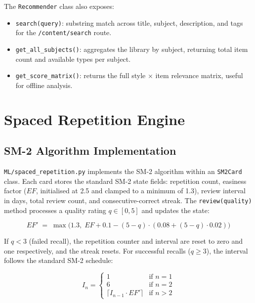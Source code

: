 \documentclass[12pt,a4paper]{article}
\begin{document}
The \texttt{Recommender} class also exposes:
\begin{itemize}[leftmargin=*]
  \item \texttt{search(query)}: substring match across title,
    subject, description, and tags for the \texttt{/content/search}
    route.
  \item \texttt{get\_all\_subjects()}: aggregates the library by
    subject, returning total item count and available types per
    subject.
  \item \texttt{get\_score\_matrix()}: returns the full
    style $\times$ item relevance matrix, useful for offline
    analysis.
\end{itemize}

\section{Spaced Repetition Engine}

\subsection{SM-2 Algorithm Implementation}

\texttt{ML/spaced\_repetition.py} implements the SM-2 algorithm
\cite{supermemo} within an \texttt{SM2Card} class. Each card stores
the standard SM-2 state fields: repetition count, easiness factor
($EF$, initialised at 2.5 and clamped to a minimum of 1.3), review
interval in days, total review count, and consecutive-correct
streak. The \texttt{review(quality)} method processes a quality
rating $q \in [0,5]$ and updates the state:

\begin{equation}
  EF' \;=\; \max\!\bigl(1.3,\;
  EF + 0.1 - (5-q)\cdot(0.08 + (5-q)\cdot 0.02)\bigr)
\end{equation}

If $q < 3$ (failed recall), the repetition counter and interval are
reset to zero and one respectively, and the streak resets. For
successful recalls ($q \ge 3$), the interval follows the standard
SM-2 schedule:

\begin{equation}
  I_n =
  \begin{cases}
    1  & \text{if } n = 1 \\
    6  & \text{if } n = 2 \\
    \lceil I_{n-1} \cdot EF' \rceil & \text{if } n > 2
  \end{cases}
\end{equation}
\end{document}

